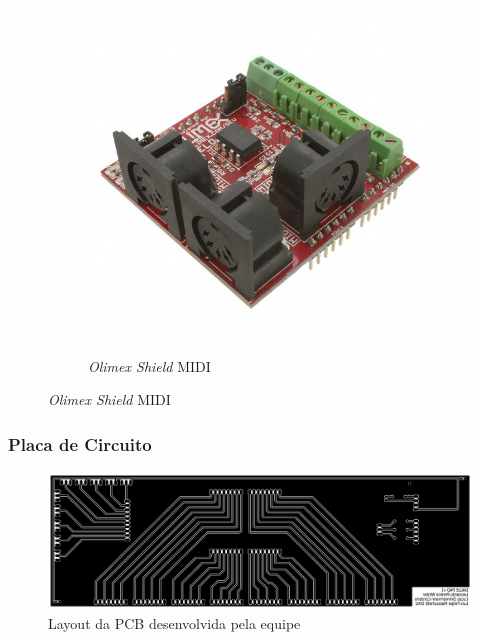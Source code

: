 \documentclass[hyperref={pdfpagelabels=false}]{beamer}
\begin{document}
\begin{frame}
\begin{figure}[H]
                        \begin{subfigure}[b]{.45\textwidth}
                            \centering
                        	\includegraphics[scale=0.15]{Imagens/Zi07.jpg}
                        	\caption[\textit{Olimex Shield} MIDI]{\textit{Olimex Shield} MIDI}
                        	\label{fig:backview}
                        \end{subfigure}

                        \label{fig:madeiratriplex}
                    \end{figure}

                \end{frame}

                \begin{frame}\frametitle{Placa de Circuito}

                    \begin{figure}[H]
                    	\centering
                    	\includegraphics[scale=0.16]{Imagens/pcb.png}
                    	\caption[Layout da PCB desenvolvida pela equipe]{Layout da PCB desenvolvida pela equipe}
                    	\label{fig:requisitos}
                    \end{figure}

                \end{frame}
\end{document}
